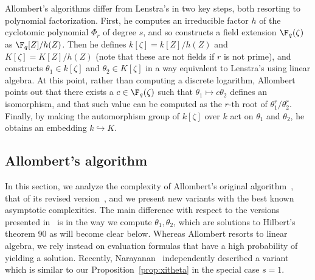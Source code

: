 Allombert's algorithms differ from Lenstra's in two key steps, both
resorting to polynomial factorization.
First, he computes an irreducible factor $h$ of the cyclotomic
polynomial $\Phi_r$ of degree $s$,
and so constructs a field extension $\F_q(\zeta)$ as $\F_q[Z]/h(Z)$.
Then he defines $k[\zeta]=k[Z]/h(Z)$ and $K[\zeta]=K[Z]/h(Z)$
(note that these are not fields if $r$ is not prime), and constructs
$\theta_1\in k[\zeta]$ and $\theta_2\in K[\zeta]$ in a way equivalent
to Lenstra's using linear algebra. 
At this point, rather than computing a discrete
logarithm, Allombert points out that there exists a $c\in\F_q(\zeta)$
such that $\theta_1\mapsto c\theta_2$ defines an isomorphism,
and that such value can be
computed as the $r$-th root of $\theta_1^r/\theta_2^r$.
Finally, by making the automorphism group of $k[\zeta]$ over $k$ act
on $\theta_1$ and $\theta_2$, he obtains an embedding $k \hookrightarrow K$.%


\subsection{Allombert's algorithm}
\label{sec:fast-kummer}

In this section, we analyze the complexity of Allombert's original
algorithm~\cite{Allombert02}, that of its revised version~\cite{Allombert02-rev},
and we present new variants with the best known asymptotic complexities.
The main difference with respect to the 
versions presented in~\cite{Allombert02,Allombert02-rev} is in the way
we compute $\theta_1, \theta_2$, which are solutions to Hilbert's theorem 90
as will become clear below.
Whereas Allombert resorts to linear algebra, we rely instead on evaluation
formulas that have a high probability of yielding a solution.
Recently, Narayanan~\cite[Sec.~3]{narayanan2016fast} independently described 
a variant which is similar to our Proposition~\ref{prop:xitheta}
in the special case $s=1$.

